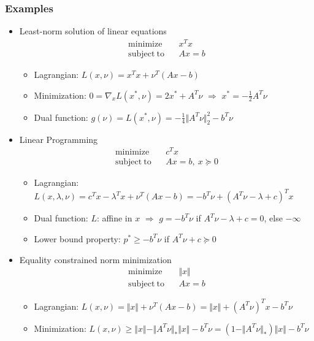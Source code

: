 \subsubsection*{Examples}
\begin{itemize}
    \item Least-norm solution of linear equations
        $$ \begin{aligned}
            \mathrm{minimize}~~&~~x^Tx \\
            \mathrm{subject~to}~~&~~Ax = b
        \end{aligned} $$
    \begin{itemize}
        \item Lagrangian: $L(x,\nu) = x^Tx + \nu^T(Ax-b)$
        \item Minimization: $0 = \nabla_xL(x^\ast,\nu) = 2x^\ast+A^T\nu$ $\Rightarrow$ $x^\ast=-\frac{1}{2}A^T\nu$
        \item Dual function: $g(\nu)=L(x^\ast,\nu)=-\frac{1}{4}\Vert A^T\nu\Vert_2^2-b^T\nu$
    \end{itemize}
    \item Linear Programming
        $$ \begin{aligned}
            \mathrm{minimize}~~&~~c^Tx \\
            \mathrm{subject~to}~~&~~Ax = b,~x\succeq 0
        \end{aligned} $$
    \begin{itemize}
        \item Lagrangian: $L(x,\lambda,\nu)=c^Tx-\lambda^Tx+\nu^T(Ax-b)=-b^T\nu+(A^T\nu-\lambda+c)^Tx$
        \item Dual function: $L$: affine in $x$ $\Rightarrow$ $g = -b^T\nu$ if $A^T\nu-\lambda+c=0$, else $-\infty$
        \item Lower bound property: $p^\ast\geq-b^T\nu$ if $A^T\nu + c \succeq 0$
    \end{itemize}
    \item Equality constrained norm minimization
        $$ \begin{aligned}
            \mathrm{minimize}~~&~~\Vert x \Vert \\
            \mathrm{subject~to}~~&~~Ax = b
        \end{aligned} $$
    \begin{itemize}
        \item Lagrangian: $L(x,\nu)=\Vert x\Vert+\nu^T(Ax-b) = \Vert x\Vert + (A^T\nu)^Tx - b^T\nu$
        \item Minimization: $L(x,\nu)\geq\Vert x\Vert -\Vert A^T\nu\Vert_\ast \Vert x\Vert - b^T\nu = (1-\Vert A^T\nu\Vert_\ast)\Vert x\Vert-b^T\nu$

\end{itemize}
\end{itemize}
